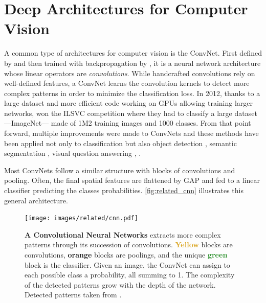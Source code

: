 \section{Deep Architectures for Computer Vision}

A common type of architectures for computer vision is the \acf{ConvNet}. First defined by
\cite{fukushima1980neocognitron} and then trained with backpropagation by \cite{lecun1999lenet}, it
is a neural network architecture whose linear operators are \textit{convolutions}. While
handcrafted convolutions \citep{lowe1999sift} rely on well-defined features, a \ac{ConvNet} learns
the convolution kernels to detect more complex patterns in order to minimize the classification
loss. In 2012, thanks to a large dataset and more efficient code working on \acp{GPU} allowing
training larger networks, \cite{krizhevsky2012alexnet} won the ILSVC competition
\citep{russakovsky2015imagenet_ilsvrc} where they had to classify a large dataset ---ImageNet---
made of 1M2 training images and 1000 classes. From that point forward, multiple improvements were
made to \acp{ConvNet} \citep{ioffe2015batchnorm,he2016resnet} and these methods have been applied not
only to classification but also object detection \citep{ren20fasterrcnn}, semantic segmentation
\citep{chen2018deeplab}, visual question answering \citep{antol2015vqa}, \etc.

Most \acp{ConvNet} follow a similar structure with blocks of convolutions and pooling. Often, the
final spatial features are flattened by \ac{GAP} and fed to a linear classifier
predicting the classes probabilities. \autoref{fig:related_cnn} illustrates this general architecture.

\begin{figure}[tb]
      \begin{center}
            \texttt{[image: images/related/cnn.pdf]}
      \end{center}
      \caption{\textbf{A Convolutional Neural Networks} extracts more complex patterns through its
            succession of convolutions. \textcolor{Goldenrod}{\textbf{Yellow}} blocks are
            convolutions, \textcolor{BurntOrange}{\textbf{orange}} blocks are poolings, and the
            unique \textcolor{ForestGreen}{\textbf{green}} block is the classifier. Given an image,
            the \ac{ConvNet} can assign to each possible class a probability, all summing to 1. The
            complexity of the detected patterns grow with the depth of the network. Detected
            patterns taken from \cite{olah2017feature}.}
      \label{fig:related_cnn}
\end{figure}

